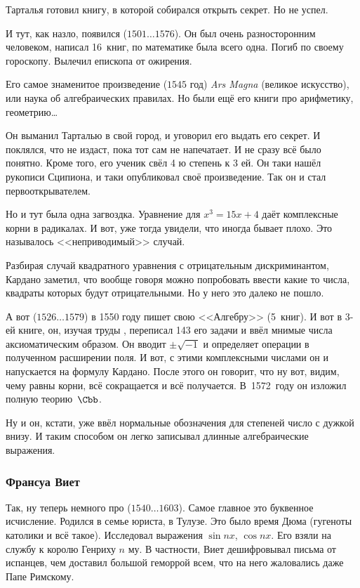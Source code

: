 \documentclass[a4paper,oneside,fleqn,10pt]{article}
\newcommand{\pe}[2]{${#1}\ldots{#2}$}
\begin{document}
Тарталья готовил книгу, в которой собирался открыть секрет. Но не
успел.

И тут, как назло, появился  (\pe{1501}{1576}). Он был очень разносторонним человеком,
написал 16~книг, по математике была всего одна. Погиб по своему
гороскопу.  Вылечил епископа от ожирения.

Его самое знаменитое произведение ($1545$ год) \emph{Ars Magna}
(великое искусство), или наука об алгебраических правилах. Но были ещё
его книги про арифметику, геометрию\ldots

Он выманил Тарталью в свой город, и уговорил его выдать его секрет. И
поклялся, что не издаст, пока тот сам не напечатает. И не сразу всё
было понятно.  Кроме того, его ученик  свёл 4 ю степень к 3 ей. Он таки нашёл
рукописи Сципиона, и таки опубликовал своё произведение. Так он и стал
первооткрывателем.

Но и тут была одна загвоздка. Уравнение для $x^3 = 15x + 4$ даёт
комплексные корни в радикалах.  И вот, уже тогда увидели, что иногда
бывает плохо. Это называлось <<неприводимый>> случай.

Разбирая случай квадратного уравнения с отрицательным дискриминантом,
Кардано заметил, что вообще говоря можно попробовать ввести какие то
числа, квадраты которых будут отрицательными.  Но у него это далеко не
пошло.

А вот  (\pe{1526}{1579}) в 1550 году
пишет свою <<Алгебру>> (5~книг).  И вот в 3-ей книге, он, изучая труды
, переписал 143 его задачи и ввёл мнимые
числа аксиоматическим образом. Он вводит $\pm\sqrt{-1}$ и определяет
операции в полученном расширении поля. И вот, с этими комплексными
числами он и напускается на формулу Кардано. После этого он говорит,
что ну вот, видим, чему равны корни, всё сокращается и всё
получается. В~1572~году он изложил полную теорию~$\Cbb$.

Ну и он, кстати, уже ввёл нормальные обозначения для степеней число с
дужкой внизу.  И таким способом он легко записывал длинные
алгебраические выражения.

\subsubsection{Франсуа Виет}

Так, ну теперь немного про 
(\pe{1540}{1603}). Самое главное это буквенное исчисление.  Родился в
семье юриста, в Тулузе. Это было время Дюма (гугеноты католики и всё
такое).  Исследовал выражения $\sin nx$, $\cos nx$. Его взяли на
службу к королю Генриху $n$ му.  В частности, Виет дешифровывал письма
от испанцев, чем доставил большой геморрой всем, что на него
жаловались даже Папе Римскому.
\end{document}
